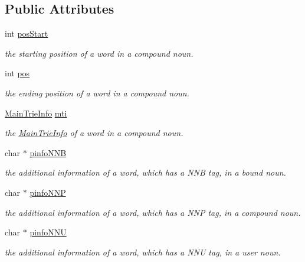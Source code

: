 \subsection*{Public Attributes}
\begin{CompactItemize}
\item 
int \hyperlink{classSearchInfo_2a955623e5f507d0c2df9f133821d171}{posStart}
\begin{CompactList}\small\item\em the starting position of a word in a compound noun. \item\end{CompactList}\item 
int \hyperlink{classSearchInfo_9e2641d39b3de2afeb7291f733c54623}{pos}
\begin{CompactList}\small\item\em the ending position of a word in a compound noun. \item\end{CompactList}\item 
\hyperlink{classMainTrieInfo}{MainTrieInfo} \hyperlink{classSearchInfo_e7aed0fc570d3716eba7231ea01dbeb0}{mti}
\begin{CompactList}\small\item\em the \hyperlink{classMainTrieInfo}{MainTrieInfo} of a word in a compound noun. \item\end{CompactList}\item 
char $\ast$ \hyperlink{classSearchInfo_194202f3304000bdb1caa7a1d5c221d2}{pinfoNNB}
\begin{CompactList}\small\item\em the additional information of a word, which has a NNB tag, in a bound noun. \item\end{CompactList}\item 
char $\ast$ \hyperlink{classSearchInfo_3ca4a80c815323c4ab3e372f2bc14d32}{pinfoNNP}
\begin{CompactList}\small\item\em the additional information of a word, which has a NNP tag, in a compound noun. \item\end{CompactList}\item 
char $\ast$ \hyperlink{classSearchInfo_2ea8a9d4ac4564debbb0a00105be5b59}{pinfoNNU}
\begin{CompactList}\small\item\em the additional information of a word, which has a NNU tag, in a user noun. \item\end{CompactList}\end{CompactItemize}


